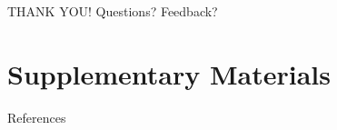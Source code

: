 \documentclass{beamer}
\begin{document}
	\fi
	\begin{frame}[standout]
		THANK YOU! 
		Questions? Feedback? 
	\end{frame}

\appendix
\section{Supplementary Materials}

	\nocite{RCoreTeam2016,Bettencourt2015,Bivand2014a,Bivand2014b,Bivand2014,Cover1991,Csiszzr2004,Lee2008,Massey1988,Reardon2002,Reardon2004}


	\begin{frame}[allowframebreaks]{References}
		    
		    
	\end{frame}
\end{document}
